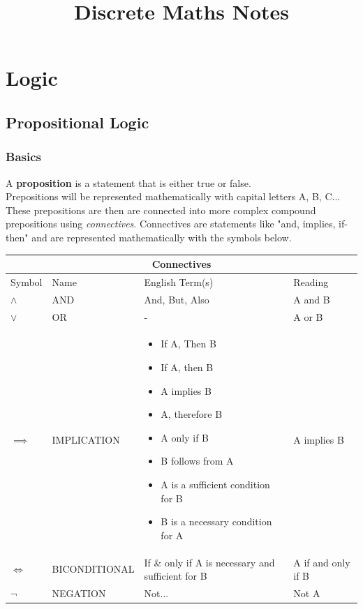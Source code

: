 \documentclass[12pt, letterpaper]{article}
\title{Discrete Maths Notes}
\begin{document}
\maketitle
\tableofcontents
\pagebreak


\section{Logic}
\bigbreak\bigbreak
\subsection{Propositional Logic}
\bigbreak
\subsubsection{Basics}

\indent
{}A \textbf{proposition} is a statement that is either true or false. \\
Prepositions will be represented mathematically with capital letters A, B, C... \\ These prepositions are then are connected into more complex compound prepositions using \emph{connectives}. Connectives are statements like "and, implies, if-then" and are represented mathematically with the symbols below.

\begin{center}
\begin{tabular}{ |p{1.5cm}|p{3.75cm}|p{5.8cm}|p{3.25cm}| }
 \hline
 \multicolumn{4}{|c|}{Connectives} \\
 \hline
 \hline
 \rowcolor{lightgray} Symbol& Name & English Term(s) & Reading \\
 \hline
 	$\land$ 	& 	AND 		& And, But, Also	& A and B  	\\
	\hline
 	$\lor$ 		& 	OR 			& -	& A or B	\\
	\hline
 	$\implies$ 	& 	IMPLICATION	& \begin{itemize}[leftmargin=*, label={}]
		\item If A, Then B
		\item If A, then B
	 	\item A implies B
		\item A, therefore B
		\item A only if B
		\item B follows from A
		\item A is a sufficient condition for B
		\item B is a necessary condition for A 
	\end{itemize} & A implies B \\
	\hline
	$\iff$ 		&	BICONDITIONAL	& If \& only if	 A is necessary and sufficient for B & A if and only if B 	\\
	\hline
	$\neg$ 		&	NEGATION		& Not... & Not A \\
 \hline	
\end{tabular}
\end{center}
\end{document}
